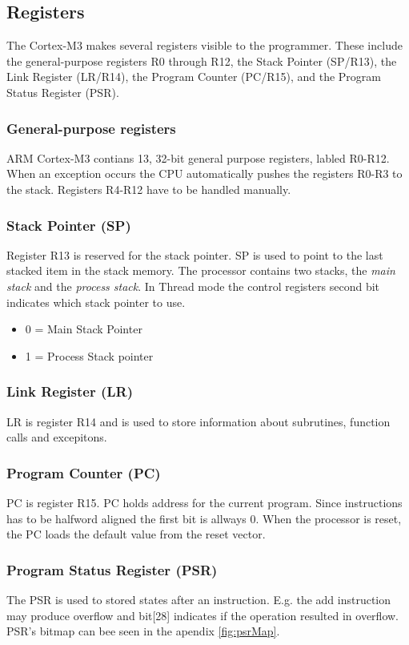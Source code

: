 \subsection{Registers}
The Cortex-M3 makes several registers visible to the programmer. These include the general-purpose registers R0 through R12, the Stack Pointer (SP/R13), the Link Register (LR/R14), the Program Counter (PC/R15), and the Program Status Register (PSR). 

\subsubsection{General-purpose registers}
ARM Cortex-M3 contians 13, 32-bit general purpose registers, labled R0-R12. When an exception occurs the CPU automatically pushes the registers R0-R3 to the stack. Registers R4-R12 have to be handled manually.

\subsubsection{Stack Pointer (SP)}
Register R13 is reserved for the stack pointer. SP is used to point to the last stacked item in the stack memory. The processor contains two stacks, the \emph{main stack} and the \emph{process stack}. In Thread mode the control registers second bit indicates which stack pointer to use.

\begin{itemize}
\item 0 = Main Stack Pointer
\item 1 = Process Stack pointer
\end{itemize}

\subsubsection{Link Register (LR)}
LR is register R14 and is used to store information about subrutines, function calls and excepitons.

\subsubsection{Program Counter (PC)}
PC is register R15. PC holds address for the current program. Since instructions has to be halfword aligned the first bit is allways 0. When the processor is reset, the PC loads the default value from the reset vector. 

\subsubsection{Program Status Register (PSR)}
The PSR is used to stored states after an instruction. E.g. the add instruction may produce overflow and bit[28] indicates if the operation resulted in overflow. PSR's bitmap can bee seen in the apendix \ref{fig:psrMap}.

